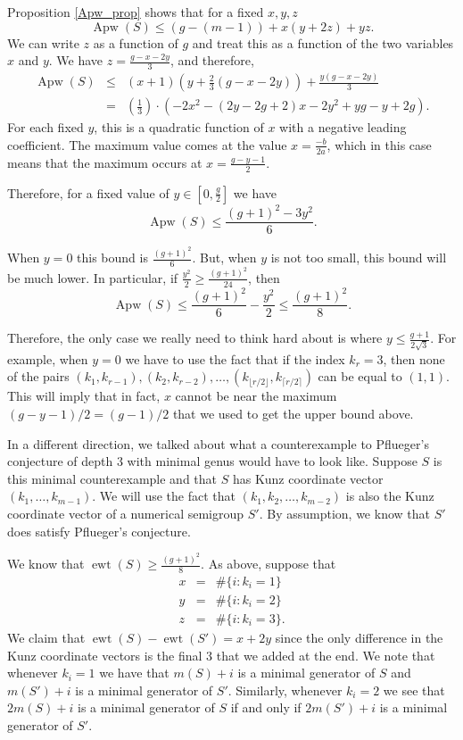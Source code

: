 \documentclass{amsart}
\DeclareMathOperator{\Apw}{Apw}
\DeclareMathOperator{\ewt}{ewt}
\theoremstyle{plain}\newtheorem{proposition}{Proposition}[section]
\theoremstyle{remark}\newtheorem{example}[proposition]{Example}
\begin{document}
Proposition \ref{Apw_prop} shows that for a fixed $x,y,z$
\[
\Apw(S) \le (g-(m-1)) + x(y+2z) + yz.
\]
We can write $z$ as a function of $g$ and treat this as a function of the two variables $x$ and $y$.  We have $z = \frac{g-x-2y}{3}$, and therefore,
\begin{eqnarray*}
\Apw(S) & \le & (x+1) (y+\frac{2}{3} (g-x-2y)) + \frac{y(g-x-2y)}{3} \\
& = &  \left(\frac{1}{3}\right) \cdot (-2 x^{2} - (2y-2g+2)x - 2 y^{2} + y g  - y + 2 g).
\end{eqnarray*}
For each fixed $y$, this is a quadratic function of $x$ with a negative leading coefficient.  The maximum value comes at the value $x = \frac{-b}{2a}$, which in this case means that the maximum occurs at $x= \frac{g-y-1}{2}$.

Therefore, for a fixed value of $y \in [0,\frac{g}{2}]$ we have 
\[
\Apw(S) \le \frac{(g+1)^2 -3y^2}{6}.
\]

When $y = 0$ this bound is $\frac{(g+1)^2}{6}$.  But, when $y$ is not too small, this bound will be much lower.  In particular, if $\frac{y^2}{2} \ge \frac{(g+1)^2}{24}$, then 
\[
\Apw(S) \le \frac{(g+1)^2}{6} - \frac{y^2}{2} \le \frac{(g+1)^2}{8}.
\]

Therefore, the only case we really need to think hard about is where $y \le \frac{g+1}{2\sqrt{3}}$.  For example, when $y = 0$ we have to use the fact that if the index $k_r = 3$, then none of the pairs $(k_1, k_{r-1}), (k_2,k_{r-2}),\ldots, (k_{\lfloor{r/2}\rfloor},k_{\lceil r/2 \rceil})$ can be equal to $(1,1)$.  This will imply that in fact, $x$ cannot be near the maximum $(g-y-1)/2 = (g-1)/2$ that we used to get the upper bound above.

\newpage

In a different direction, we talked about what a counterexample to Pflueger's conjecture of depth $3$ with minimal genus would have to look like.  Suppose $S$ is this minimal counterexample and that $S$ has Kunz coordinate vector $(k_1,\ldots, k_{m-1})$.  We will use the fact that $(k_1, k_2,\ldots, k_{m-2})$ is also the Kunz coordinate vector of a numerical semigroup $S'$.  By assumption, we know that $S'$ does satisfy Pflueger's conjecture.  

We know that $\ewt(S) \ge \frac{(g+1)^2}{8}$.  As above, suppose that
\begin{eqnarray*}
x & = & \#\{i\colon k_i = 1\}\\
y & = &  \#\{i\colon k_i = 2\}\\
 z & = & \#\{i\colon k_i = 3\}.
\end{eqnarray*}
We claim that $\ewt(S) - \ewt(S') = x + 2y$ since the only difference in the Kunz coordinate vectors is the final $3$ that we added at the end.  We note that whenever $k_i = 1$ we have that $m(S)+i$ is a minimal generator of $S$ and $m(S') + i$ is a minimal generator of $S'$.  Similarly, whenever $k_i = 2$ we see that $2m(S) + i$ is a minimal generator of $S$ if and only if $2m(S') + i$ is a minimal generator of $S'$.
\end{document}
